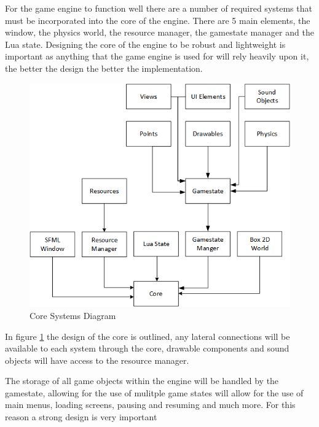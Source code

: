 \documentclass[11pt,a4paper,titlepage]{report}
\begin{document}
	
	For the game engine to function well there are a number of required systems that must be incorporated into the core of the engine. There are 5 main elements, the window, the physics world, the resource manager, the gamestate manager and the Lua state. Designing the core of the engine to be robust and lightweight is important as anything that the game engine is used for will rely heavily upon it, the better the design the better the implementation.

	\begin{figure}[h] 
		\centering
		\includegraphics[scale=0.75]{core1}
		\caption{Core Systems Diagram}
		\label{fig:CoreDiagram1}
	\end{figure}

	In figure \ref{fig:CoreDiagram1} the design of the core is outlined, any lateral connections will be available to each system through the core, drawable components and sound objects will have access to the resource manager.

	The storage of all game objects within the engine will be handled by the gamestate, allowing for the use of mulitple game states will allow for the use of main menus, loading screens, pausing and resuming and much more. For this reason a strong design is very important

	
\end{document}
